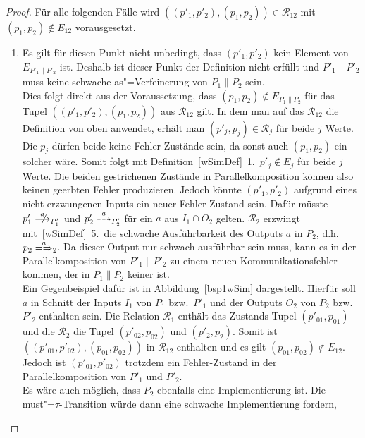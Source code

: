 \begin{proof}
  Für alle folgenden Fälle wird $((p'_1,p'_2),(p_1,p_2))\in\mathcal{R}_{12}$
  mit $(p_1,p_2)\notin E_{12}$ vorausgesetzt.
  \begin{enumerate}
    \item Es gilt für diesen Punkt nicht unbedingt, dass $(p'_1,p'_2)$ kein
      Element von $E_{P'_1\|P'_2}$ ist. Deshalb ist dieser Punkt der Definition
      nicht erfüllt und $P'_1\|P'_2$ muss keine schwache as"=Verfeinerung von
      $P_1\|P_2$ sein.\\
      Dies folgt direkt aus der Voraussetzung, dass $(p_1,p_2)\notin
      E_{P_1\|P_2}$ für das Tupel $((p'_1,p'_2),(p_1,p_2))$ aus
      $\mathcal{R}_{12}$ gilt. In dem man auf das $\mathcal{R}_{12}$ die
      Definition von oben anwendet, erhält man $(p'_j,p_j)\in\mathcal{R}_j$ für
      beide $j$ Werte. Die $p_j$ dürfen beide keine Fehler-Zustände sein, da
      sonst auch $(p_1,p_2)$ ein solcher wäre. Somit folgt mit
      Definition~\ref{wSimDef}~1.\ $p'_j\notin E_j$ für beide $j$ Werte. Die
      beiden gestrichenen Zustände in Parallelkomposition können also keinen
      geerbten Fehler produzieren. Jedoch könnte $(p'_1,p'_2)$ aufgrund eines
      nicht erzwungenen Inputs ein neuer Fehler-Zustand sein. Dafür müsste
      \oBdA{} $p'_1\nmust[a]_{P'_1}$ und $p'_2\may[a]_{P'_2}$ für ein $a$ aus
      $I_1\cap O_2$ gelten. $\mathcal{R}_2$ erzwingt mit~\ref{wSimDef}~5.\ die
      schwache Ausführbarkeit des Outputs $a$ in $P_2$, d.h.\ $p_2
      \weakmay[a]_2$. Da dieser Output nur schwach ausführbar sein muss, kann
      es in der Parallelkomposition von $P'_1\|P'_2$ zu einem neuen
      Kommunikationsfehler kommen, der in $P_1\|P_2$ keiner ist.\\
      Ein Gegenbeispiel dafür ist in Abbildung~\ref{bsp1wSim} dargestellt.
      Hierfür soll $a$ in Schnitt der Inputs $I_1$ von $P_1$ bzw.\ $P'_1$ und
      der Outputs $O_2$ von $P_2$ bzw.\ $P'_2$ enthalten sein. Die Relation
      $\mathcal{R}_1$ enthält das Zustands-Tupel $(p'_{01},p_{01})$ und die
      $\mathcal{R}_2$ die Tupel $(p'_{02},p_{02})$ und $(p'_2,p_2)$. Somit ist
      $((p'_{01},p'_{02}),(p_{01},p_{02}))$ in $\mathcal{R}_{12}$ enthalten und
      es gilt $(p_{01},p_{02})\notin E_{12}$. Jedoch ist $(p'_{01},p'_{02})$
      trotzdem ein Fehler-Zustand in der Parallelkomposition von $P'_1$ und
      $P'_2$.\\
      Es wäre auch möglich, dass $P_2$ ebenfalls eine Implementierung ist. Die
      must"=$\tau$-Transition würde dann eine schwache Implementierung fordern,

\end{enumerate}
\end{proof}
